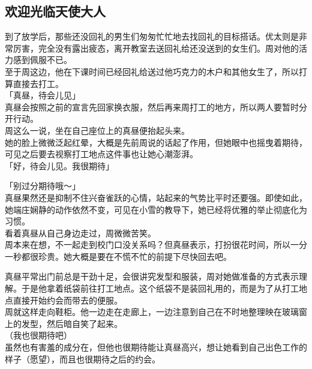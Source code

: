 \subsection{欢迎光临天使大人}

到了放学后，那些还没回礼的男生们匆匆忙忙地去找回礼的目标搭话。优太则是非常厉害，完全没有露出疲态，离开教室去送回礼给还没送到的女生们。周对他的活力感到佩服不已。\\

至于周这边，他在下课时间已经回礼给送过他巧克力的木户和其他女生了，所以打算直接去打工。\\

「真昼，待会儿见」\\

真昼会按照之前的宣言先回家换衣服，然后再来周打工的地方，所以两人要暂时分开行动。\\

周这么一说，坐在自己座位上的真昼便抬起头来。\\

她的脸上微微泛起红晕，大概是先前周说的话起了作用，但她眼中也摇曳着期待，可见之后要去视察打工地点这件事也让她心潮澎湃。\\

「好，待会儿见。我很期待」

「别过分期待哦～」\\

真昼果然还是抑制不住兴奋雀跃的心情，站起来的气势比平时还要强。即使如此，她端庄娴静的动作依然不变，可见在小雪的教导下，她已经将优雅的举止彻底化为习惯。\\

看着真昼从自己身边走过，周微微苦笑。\\

周本来在想，不一起走到校门口没关系吗？但真昼表示，打扮很花时间，所以一分一秒都很珍贵。她大概是要在不慌不忙的前提下尽快回去吧。

真昼平常出门前总是干劲十足，会很讲究发型和服装，周对她做准备的方式表示理解。于是他拿着纸袋前往打工地点。这个纸袋不是装回礼用的，而是为了从打工地点直接开始约会而带去的便服。\\

周就这样走向鞋柜。他一边走在走廊上，一边注意到自己在不时地整理映在玻璃窗上的发型，然后暗自笑了起来。\\

（我也很期待吧）\\

虽然也有害羞的成分在，但他也很期待能让真昼高兴，想让她看到自己出色工作的样子（愿望），而且也很期待之后的约会。\\

